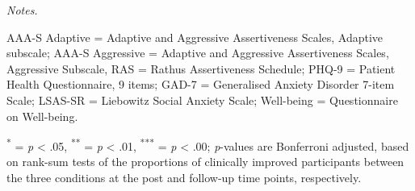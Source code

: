 \documentclass[3p]{elsarticle} %
\begin{document}
\begin{table}
\begin{threeparttable}
\begin{tablenotes}
\item \textit{Notes.} 
\item AAA-S Adaptive = Adaptive and Aggressive Assertiveness Scales, Adaptive subscale; AAA-S Aggressive = Adaptive and Aggressive Assertiveness Scales, Aggressive Subscale, RAS = Rathus Assertiveness Schedule; PHQ-9 = Patient Health Questionnaire, 9 items; GAD-7 = Generalised Anxiety Disorder 7-item Scale; LSAS-SR = Liebowitz Social Anxiety Scale; Well-being = Questionnaire on Well-being.
\item \textsuperscript{*} = \textit{p} < .05, \textsuperscript{**} = \textit{p} < .01, \textsuperscript{***} = \textit{p} < .00; \textit{p}-values are Bonferroni adjusted, based on rank-sum tests of the proportions of clinically improved participants between the three conditions at the post and follow-up time points, respectively.
\end{tablenotes}
\end{threeparttable}
\end{table}
\end{document}
